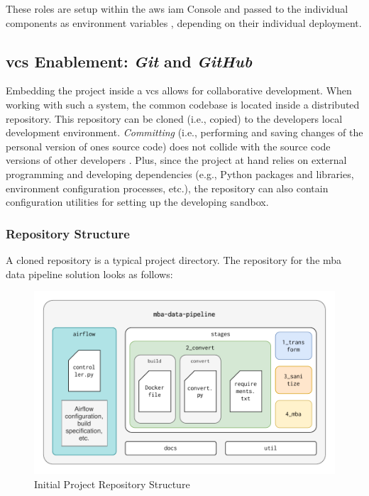 These roles are setup within the \ac{aws} \ac{iam} Console and passed to the individual components as environment variables \cite{iam}, depending on their individual deployment. 

\subsection{\acs{vcs} Enablement: \textit{Git} and \textit{GitHub}}
Embedding the project inside a \ac{vcs} allows for collaborative development. When working with such a system, the common codebase is located inside a distributed repository. This repository can be cloned (i.e., copied) to the developers local development environment. \textit{Committing} (i.e., performing and saving changes of the personal version of ones source code) does not collide with the source code versions of other developers \cite[9\psqq]{Chacon2020}. Plus, since the project at hand relies on external programming and developing dependencies (e.g., Python packages and libraries, environment configuration processes, etc.), the repository can also contain configuration utilities for setting up the developing sandbox.

\subsubsection{Repository Structure}
A cloned repository is a typical project directory. The repository for the \ac{mba} data pipeline solution looks as follows:

\begin{figure}[h!]
	\centering
	\includegraphics[width=\linewidth]{main-matter/img/5-repo-structure.pdf}
	\caption{Initial Project Repository Structure}
	\label{fig:5-repo-structure}
\end{figure}

